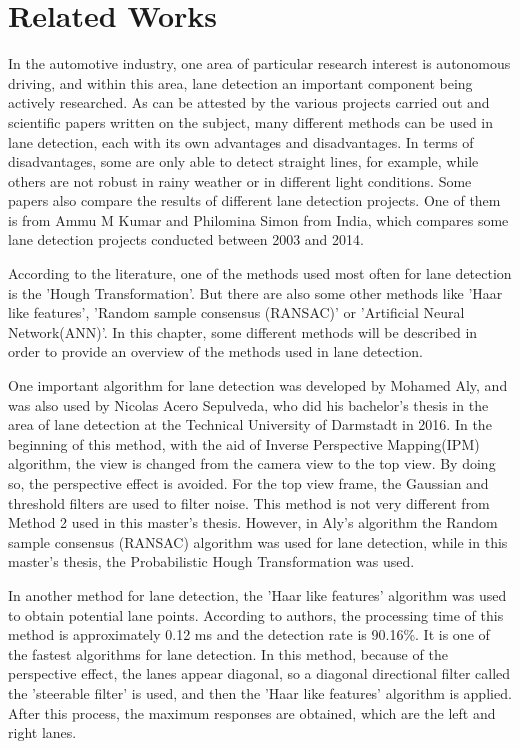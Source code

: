 %
\chapter{Related Works}\label{cha:Related Works}

In the automotive industry, one area of particular research interest is autonomous driving, and within this area, lane detection an important component being actively researched. As can be attested by the various projects carried out and scientific papers written on the subject, many different methods can be used in lane detection, each with its own advantages and disadvantages. In terms of disadvantages, some are only able to detect straight lines, for example, while others are not robust in rainy weather or in different light conditions. Some papers also compare the results of different lane detection projects. One of them is from Ammu M Kumar and Philomina Simon from India, which compares some lane detection projects conducted between 2003 and 2014.\cite{Review_of_Lane_Detection}
 
According to the literature, one of the methods used most often for lane detection is the 'Hough Transformation'. But there are also some other methods like 'Haar like features', 'Random sample consensus (RANSAC)' or 'Artificial Neural Network(ANN)'. In this chapter, some different methods will be described in order to provide an overview of the methods used in lane detection.

One important algorithm for lane detection was developed by Mohamed Aly, and was also used by Nicolas Acero Sepulveda, who did his bachelor's thesis in the area of lane detection at the Technical University of Darmstadt in 2016.\cite{Bachelorthesis_Nicolas} In the beginning of this method, with the aid of Inverse Perspective Mapping(IPM) algorithm, the view is changed from the camera view to the top view. By doing so, the perspective effect is avoided. For the top view frame, the Gaussian and threshold filters are used to filter noise. This method is not very different from Method 2 used in this master's thesis. However, in Aly's algorithm the Random sample consensus (RANSAC) algorithm was used for lane detection, while in this master's thesis, the Probabilistic Hough Transformation was used.

In another method\cite{An_Efficient_Lane_Detection} for lane detection, the 'Haar like features' algorithm was used to obtain potential lane points. According to authors, the processing time of this method is approximately 0.12 ms and the detection rate is 90.16\%. It is one of the fastest algorithms for lane detection. In this method, because of the perspective effect, the lanes appear diagonal, so a diagonal directional filter called the 'steerable filter' is used, and then the 'Haar like features' algorithm is applied. After this process, the maximum responses are obtained, which are the left and right lanes.

